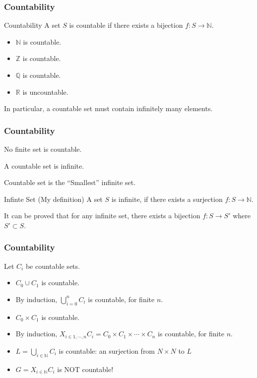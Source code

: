 \documentclass{beamer}
\begin{document}
\begin{frame}
\frametitle{Countability}

\begin{block}{Countability}
A set $S$ is countable if there exists a bijection $f: S \rightarrow \mathbb{N}$.
\end{block}

\begin{itemize}
    \item $\mathbb{N}$ is countable.
    \item $\mathbb{Z}$ is countable.
    \item $\mathbb{Q}$ is countable.
    \item $\mathbb{R}$ is uncountable.
\end{itemize}

In particular, a countable set must contain infinitely many elements.



%
\end{frame}

\begin{frame}
\frametitle{Countability}

No finite set is countable.

A countable set is infinite.

Countable set is the ``Smallest'' infinite set. 

\begin{block}{Infinte Set (My definition)}
  A set $S$ is infinite, if there exists a surjection $f: S \rightarrow \mathbb{N}$.
\end{block}

It can be proved that for any infinite set, there exists a bijection $f: S \rightarrow S'$ where $S' \subset S$.
\end{frame}

\begin{frame}
\frametitle{Countability}

Let $C_i$ be countable sets.

\begin{itemize}
  \item $C_0 \cup C_1$ is countable.
  \item By induction, $\bigcup_{i=0}^n C_i$ is countable, for finite $n$.
  \item $C_0 \times C_1$ is countable.
  \item By induction, $X_{i\in 1, \cdots , n} C_i = C_0\times C_1 \times \cdots \times C_n$ is countable, for finite $n$.
  \item $L=\bigcup_{i\in \mathbb{N}} C_i$ is countable: an surjection from $N\times N $ to $L$ 
  \item $G=X_{i\in \mathbb{N}} C_i$ is \alert{NOT} countable!
\end{itemize}
\end{frame}
\end{document}
